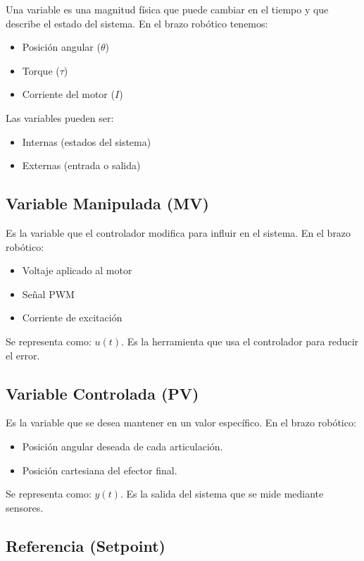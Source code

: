 \documentclass[11pt]{article}
\begin{document}
Una variable es una magnitud física que puede cambiar en el tiempo y que describe el estado del sistema. En el brazo robótico tenemos:

\begin{itemize}
	\item Posición angular ($\theta$)
	\item Torque ($\tau$)
	\item Corriente del motor ($I$)
\end{itemize}

Las variables pueden ser:

\begin{itemize}
	\item Internas (estados del sistema)
	\item Externas (entrada o salida)
\end{itemize}

\subsection{Variable Manipulada (MV)}

Es la variable que el controlador modifica para influir en el sistema. En el brazo robótico:

\begin{itemize}
	\item Voltaje aplicado al motor
	\item Señal PWM
	\item Corriente de excitación
\end{itemize}

Se representa como: $u(t)$. Es la herramienta que usa el controlador para reducir el error.

\subsection{Variable Controlada (PV)}

Es la variable que se desea mantener en un valor específico. En el brazo robótico:

\begin{itemize}
	\item Posición angular deseada de cada articulación.
	\item Posición cartesiana del efector final.
\end{itemize}

Se representa como: $y(t)$. Es la salida del sistema que se mide mediante sensores.

\subsection{Referencia (Setpoint)}
\end{document}
